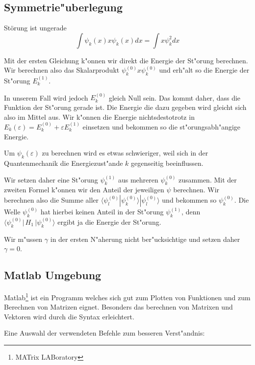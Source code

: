 \begin{refsection}
\subsection{Symmetrie"uberlegung}
St\"orung ist ungerade
\[
  \int \psi_k(x) x \psi_k(x) dx = \int x \psi_k^2 dx
\]







Mit der ersten Gleichung k"onnen wir direkt die Energie der St"orung berechnen.
Wir berechnen also das Skalarprodukt $\psi_k^{(0)} x \psi_k^{(0)}$
und erh"alt so die Energie der St"orung $E_k^{(1)}$.


In unserem Fall wird jedoch $E_k^{(0)}$ gleich Null sein.
Das kommt daher, dass die Funktion der St"orung gerade ist.
Die Energie die dazu gegeben wird gleicht sich also im Mittel aus.
Wir k"onnen die Energie nichtsdestotrotz in
$E_k(\varepsilon)=E_k^{(0)} + \varepsilon E_k^{(1)}$ einsetzen
und bekommen so die st"orungsabh"angige Energie.





Um $\psi_k(\varepsilon)$ zu berechnen wird es etwas schwieriger,
weil sich in der Quantenmechanik die Energiezust"ande $k$ gegenseitig beeinflussen.

Wir setzen daher eine St"orung $\psi_k^{(1)}$ aus mehreren $\psi_k^{(0)}$ zusammen.
Mit der zweiten Formel k"onnen wir den Anteil der jeweiligen $\psi$ berechnen.
Wir berechnen also die Summe aller $\langle\psi_l^{(0)}|\psi_k^{(0)}\rangle|\psi_l^{(0)}\rangle$
und bekommen so $\psi_k^{(0)}$.
Die Welle $\psi_k^{(0)}$ hat hierbei keinen Anteil in der St"orung $\psi_k^{(1)}$,
denn $\langle \psi_k^{(0)}|\, H_1 \,|\psi_k^{(0)}\rangle$ ergibt ja die Energie der St"orung.

Wir m"ussen $\gamma$ in der ersten N"aherung nicht ber"ucksichtige und setzen daher $\gamma = 0$.




\subsection{Matlab Umgebung}

Matlab\footnote{MATrix LABoratory} ist ein Programm welches sich gut zum Plotten von Funktionen
und zum Berechnen von Matrizen eignet.
Besonders das berechnen von Matrixen und Vektoren wird durch die Syntax erleichtert.

Eine Auswahl der verwendeten Befehle zum besseren Verst"andnis:


\end{refsection}
